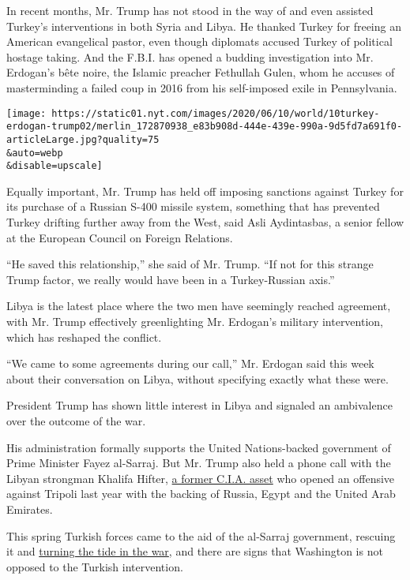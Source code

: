 In recent months, Mr. Trump has not stood in the way of and even
assisted Turkey's interventions in both Syria and Libya. He thanked
Turkey for freeing an American evangelical pastor, even though diplomats
accused Turkey of political hostage taking. And the F.B.I. has opened a
budding investigation into Mr. Erdogan's bête noire, the Islamic
preacher Fethullah Gulen, whom he accuses of masterminding a failed coup
in 2016 from his self-imposed exile in Pennsylvania.

\texttt{[image: https://static01.nyt.com/images/2020/06/10/world/10turkey-erdogan-trump02/merlin\_172870938\_e83b908d-444e-439e-990a-9d5fd7a691f0-articleLarge.jpg?quality=75\\\&auto=webp\\\&disable=upscale]}

Equally important, Mr. Trump has held off imposing sanctions against
Turkey for its purchase of a Russian S-400 missile system, something
that has prevented Turkey drifting further away from the West, said Asli
Aydintasbas, a senior fellow at the European Council on Foreign
Relations.

``He saved this relationship,'' she said of Mr. Trump. ``If not for this
strange Trump factor, we really would have been in a Turkey-Russian
axis.''

Libya is the latest place where the two men have seemingly reached
agreement, with Mr. Trump effectively greenlighting Mr. Erdogan's
military intervention, which has reshaped the conflict.

``We came to some agreements during our call,'' Mr. Erdogan said this
week about their conversation on Libya, without specifying exactly what
these were.

President Trump has shown little interest in Libya and signaled an
ambivalence over the outcome of the war.

His administration formally supports the United Nations-backed
government of Prime Minister Fayez al-Sarraj. But Mr. Trump also held a
phone call with the Libyan strongman Khalifa Hifter,
\href{https://www.nytimes.com/2020/02/18/us/politics/hifter-torture-lawsuit-libya.html?searchResultPosition=8}{a
former C.I.A. asset} who opened an offensive against Tripoli last year
with the backing of Russia, Egypt and the United Arab Emirates.

This spring Turkish forces came to the aid of the al-Sarraj government,
rescuing it and
\href{https://www.nytimes.com/2020/05/21/world/middleeast/libya-turkey-russia-hifter.html?searchResultPosition=5}{turning
the tide in the war}, and there are signs that Washington is not opposed
to the Turkish intervention.


